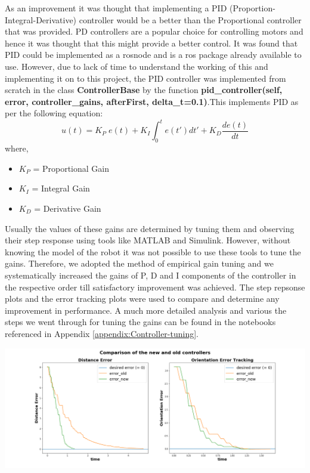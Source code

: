 \documentclass[a4paper,12pt]{article}
\begin{document}
		As an improvement it was thought that implementing a PID (Proportion-Integral-Derivative) controller would be a better than the Proportional controller that was provided. PD controllers are a popular choice for controlling motors and hence it was thought that this might provide a better control. It was found that PID could be implemented as a rosnode and is a ros package already available to use. However, due to lack of time to understand the working of this and implementing it on to this project, the PID controller was implemented from scratch in the class \textbf{ControllerBase} by the function \textbf{pid\_controller(self, error, controller\_gains, afterFirst, delta\_t=0.1)}.This implements PID as per the following equation:
		\begin{equation}
		u(t)=K_P \; e(t) + K_I \int_{0}^{t}e(t')dt'+K_D \frac{de(t)}{dt}
		\end{equation}
		where,
		\begin{itemize}
			\item $K_P$ = Proportional Gain
			\item $K_I$ = Integral Gain
			\item $K_D$ = Derivative Gain
		\end{itemize}
		
		Usually the values of these gains are determined by tuning them and observing their step response using tools like MATLAB and Simulink. However, without knowing the model of the robot it was not possible to use these tools to tune the gains. Therefore, we adopted the method of empirical gain tuning and we systematically increased the gains of P, D and I components of the controller in the respective order till satisfactory improvement was achieved. The step repsonse plots and the error tracking plots were used to compare and determine any improvement in performance. A much more detailed analysis and various the steps we went through for tuning the gains can be found in the notebooks referenced in Appendix \ref{appendix:Controller-tuning}.
		
		\includegraphics[scale=0.3]{images/compare_both.png}
		
\end{document}

